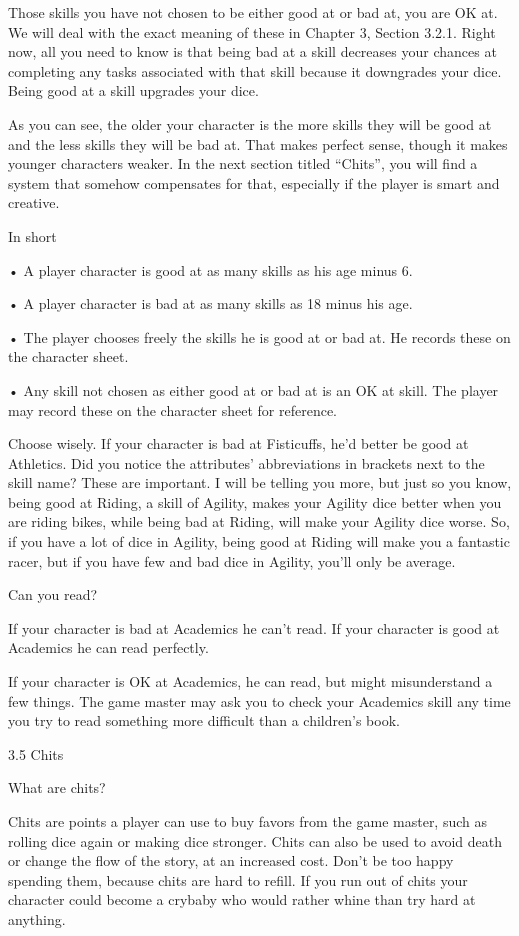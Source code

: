 Those skills you have not chosen to be either good at or bad at, you are OK at. We will deal with the exact meaning of these in Chapter 3, Section 3.2.1. Right now, all you need to know is that being bad at a skill decreases your chances at completing any tasks associated with that skill because it downgrades your dice. Being good at a skill upgrades your dice.

As you can see, the older your character is the more skills they will be good at and the less skills they will be bad at. That makes perfect sense, though it makes younger characters weaker. In the next section titled “Chits”, you will find a system that somehow compensates for that, especially if the player is smart and creative.

In short

• A player character is good at as many skills as his age minus 6. 

• A player character is bad at as many skills as 18 minus his age.

• The player chooses freely the skills he is good at or bad at. He records these on the character sheet.

• Any skill not chosen as either good at or bad at is an OK at skill. The player may record these on the character sheet for reference.

Choose wisely. If your character is bad at Fisticuffs, he'd better be good at Athletics. Did you notice the attributes' abbreviations in brackets next to the skill name? These are important. I will be telling you more, but just so you know, being good at Riding, a skill of Agility, makes your Agility dice better when you are riding bikes, while being bad at Riding, will make your Agility dice worse. So, if you have a lot of dice in Agility, being good at Riding will make you a fantastic racer, but if you have few and bad dice in Agility, you'll only be average.

Can you read?

If your character is bad at Academics he can't read. If your character is good at Academics he can read perfectly.

If your character is OK at Academics, he can read, but might misunderstand a few things. The game master may ask you to check your Academics skill any time you try to read something more difficult than a children's book. 

3.5 Chits

What are chits?

Chits are points a player can use to buy favors from the game master, such as rolling dice again or making dice stronger. Chits can also be used to avoid death or change the flow of the story, at an increased cost. Don't be too happy spending them, because chits are hard to refill. If you run out of chits your character could become a crybaby who would rather whine than try hard at anything. 


